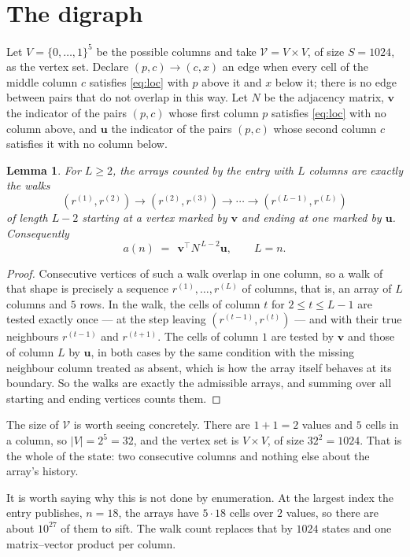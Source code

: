 \documentclass[11pt,a4paper]{article}
\theoremstyle{plain}
\newtheorem{lemma}[theorem]{Lemma}
\theoremstyle{definition}
\begin{document}
\section{The digraph}

Let $V=\{0,\dots,1\}^{5}$ be the possible columns and take
$\mathcal V=V\times V$, of size $S=1024$, as the vertex set. Declare $(p,c)\to(c,x)$ an edge
when every cell of the middle column $c$ satisfies \eqref{eq:loc} with $p$ above it and $x$
below it; there is no edge between pairs that do not overlap in this way. Let $N$ be the
adjacency matrix, $\mathbf{v}$ the indicator of the pairs $(p,c)$ whose first column $p$
satisfies \eqref{eq:loc} with no column above, and $\mathbf{u}$ the indicator of
the pairs $(p,c)$ whose second column $c$ satisfies it with no column below.

\begin{lemma}\label{lem:walk}
For $L\ge2$, the arrays counted by the entry with $L$ columns are exactly the walks
\[
(r^{(1)},r^{(2)})\to(r^{(2)},r^{(3)})\to\cdots\to(r^{(L-1)},r^{(L)})
\]
of length $L-2$ starting at a vertex marked by $\mathbf{v}$ and ending at one marked by
$\mathbf{u}$. Consequently
\[
a(n)\;=\;\,\mathbf{v}^{\!\top}N^{\,L-2}\mathbf{u},\qquad L=n .
\]
\end{lemma}

\begin{proof}
Consecutive vertices of such a walk overlap in one column, so a walk of that shape is
precisely a sequence $r^{(1)},\dots,r^{(L)}$ of columns, that is, an array of $L$ columns
and $5$ rows. In the walk, the cells of column $t$ for $2\le t\le L-1$ are tested
exactly once --- at the step leaving $(r^{(t-1)},r^{(t)})$ --- and with their true
neighbours $r^{(t-1)}$ and $r^{(t+1)}$. The cells of column $1$ are tested by
$\mathbf{v}$ and those of column $L$ by $\mathbf{u}$, in both cases by the same condition
with the missing neighbour column treated as absent, which is how the array itself behaves at
its boundary. So the walks are exactly the admissible arrays, and summing over all starting
and ending vertices counts them.
\end{proof}


The size of $\mathcal V$ is worth seeing concretely. There are $1+1=2$ values
and $5$ cells in a column, so $|V|=2^{5}=32$, and the vertex set is
$V\times V$, of size $32^2=1024$. That is the whole of the state: two consecutive
columns and nothing else about the array's history.

It is worth saying why this is not done by enumeration. At the largest index the entry
publishes, $n=18$, the arrays have $5\cdot18$ cells over
$2$ values, so there are about $10^{27}$ of them to sift. The
walk count replaces that by $1024$ states and one matrix--vector product per column.
\end{document}
